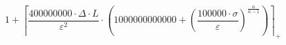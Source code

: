 \[1 + \left\lceil \frac{400000000 \cdot \Delta \cdot L}{\varepsilon^{2}} \cdot \left(1000000000000 + \left(\frac{100000 \cdot \sigma}{\varepsilon}\right)^{\frac{\alpha}{\alpha - 1}}\right) \right\rceil_{+}\]
